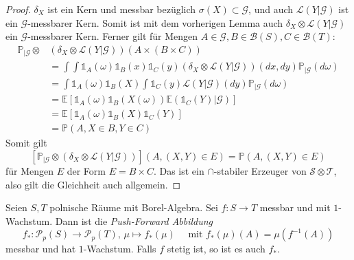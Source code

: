 \begin{proof}
    $\delta_X$ ist ein Kern und messbar bezüglich $\sigma(X)\subset \mathcal{G}$, und auch $\mathcal{L}(Y\vert \mathcal{G})$ ist ein $\mathcal{G}$-messbarer Kern. Somit ist mit dem vorherigen Lemma auch $\delta_X \otimes \mathcal{L}(Y\vert\mathcal{G})$ ein $\mathcal{G}$-messbarer Kern. Ferner gilt für Mengen $A\in \mathcal{G}, B\in\mathcal{B}(S), C \in \mathcal{B}(T)$:
    \begin{align*}
        \mathbb{P}_{\vert\mathcal{G}} \otimes &\left(\delta_X\otimes \mathcal{L}(Y\vert \mathcal{G})\right)(A\times(B\times C)) \\
        &= \int \int \mathds{1}_A(\omega)\mathds{1}_B(x)\mathds{1}_C(y) (\delta_X\otimes \mathcal{L}(Y\vert\mathcal{G}))(dx, dy)\mathbb{P}_{\vert\mathcal{G}}(d\omega) \\
        &= \int \mathds{1}_A(\omega) \mathds{1}_B(X)\int\mathds{1}_C(y)\mathcal{L}(Y\vert\mathcal{G})(dy)\mathbb{P}_{\vert\mathcal{G}}(d\omega) \\
        &= \mathbb{E}\left[\mathds{1}_A(\omega)\mathds{1}_B(X(\omega))\mathbb{E}(\mathds{1}_C(Y)\vert \mathcal{G})\right] \\
        &= \mathbb{E}\left[\mathds{1}_A(\omega)\mathds{1}_B(X)\mathds{1}_C(Y)\right] \\
        &= \mathbb{P}(A, X\in B, Y\in C)
    \end{align*}
    Somit gilt 
    $$\left[\mathbb{P}_{\vert\mathcal{G}} \otimes \left(\delta_X\otimes \mathcal{L}(Y\vert \mathcal{G})\right)\right](A, (X, Y) \in E) = \mathbb{P}(A, (X, Y)\in E)$$
    für Mengen $E$ der Form $E=B\times C$. Das ist ein $\cap$-stabiler Erzeuger von $\mathcal{S}\otimes\mathcal{T}$, also gilt die Gleichheit auch allgemein.
\end{proof}
\begin{lemma}\label{thm:pushforward_measurable}
Seien $S, T$ polnische Räume mit Borel-Algebra. Sei $f:S\rightarrow T$ messbar und mit $1$-Wachstum. Dann ist die \emph{Push-Forward Abbildung} 
$$f_*:\mathcal{P}_p(S)\rightarrow\mathcal{P}_p(T), \, \mu \mapsto f_*(\mu)\quad  \text{ mit } f_*(\mu)(A) = \mu(f^{-1}(A))$$
messbar und hat $1$-Wachstum. Falls $f$ stetig ist, so ist es auch $f_*$.
\end{lemma}
